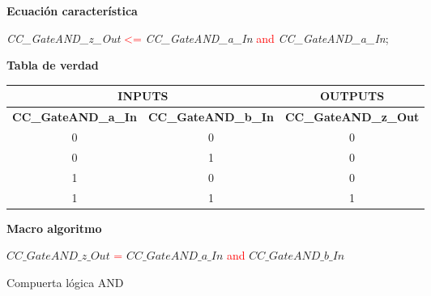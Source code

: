 \normalsize
		\begin{remark}
			\textbf{Ecuación característica}
		\end{remark}
		\begin{center}	
			\textit{CC\_GateAND\_z\_Out} \textcolor{red}{<=} \textit{CC\_GateAND\_a\_In} \textcolor{red}{and} \textit{CC\_GateAND\_a\_In}; \\
		\end{center}
		\begin{remark}
			\textbf{Tabla de verdad}
		\end{remark}
		\begin{center}	
			\begin{tabular}{|c|c|c|}
			\hline
			\multicolumn{2}{|c|}{\cellcolor{colorIN1}\textbf{INPUTS}} & \multicolumn{1}{c|}{\cellcolor{colorOUT1}\textbf{OUTPUTS}} \\ \hline
			\cellcolor{colorIN1}\textbf{CC\_GateAND\_a\_In} 	& \cellcolor{colorIN1}\textbf{CC\_GateAND\_b\_In} 	& 	\cellcolor{colorOUT1} \textbf{CC\_GateAND\_z\_Out}	\\ \hline
			\cellcolor{colorIN2} 0								& \cellcolor{colorIN2} 0							& 	\cellcolor{colorOUT2} 0								\\ \hline
			\cellcolor{colorIN2} 0								& \cellcolor{colorIN2} 1							& 	\cellcolor{colorOUT2} 0								\\ \hline
			\cellcolor{colorIN2} 1								& \cellcolor{colorIN2} 0							& 	\cellcolor{colorOUT2} 0								\\ \hline
			\cellcolor{colorIN2} 1								& \cellcolor{colorIN2} 1							& 	\cellcolor{colorOUT2} 1								\\ \hline
			\end{tabular}
		\end{center}
		\begin{remark}
			\textbf{Macro algoritmo}
		\end{remark}
			\begin{algorithm}[H]
			\SetAlgoLined
					$CC\_GateAND\_z\_Out$ \textcolor{red}{=} $CC\_GateAND\_a\_In$ \textcolor{red}{and} $CC\_GateAND\_b\_In$
				\caption{Compuerta lógica AND}
			\end{algorithm}

